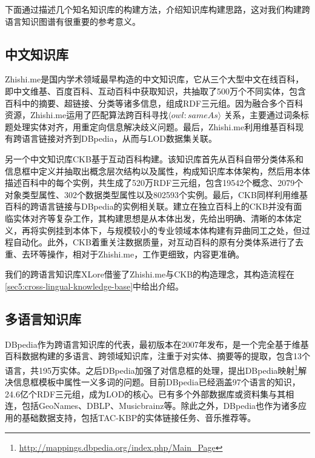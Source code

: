 下面通过描述几个知名知识库的构建方法，介绍知识库构建思路，这对我们构建跨语言知识图谱有很重要的参考意义。

\subsection{中文知识库}

Zhishi.me\cite{niu2011zhishi,wang2014publishing}是国内学术领域最早构造的中文知识库，它从三个大型中文在线百科，即中文维基、百度百科、互动百科中获取知识，共抽取了500万个不同实体，包含百科中的摘要、超链接、分类等诸多信息，组成RDF三元组。因为融合多个百科资源，Zhishi.me运用了匹配算法跨百科寻找$\langle owl:sameAs\rangle$ 关系，主要通过词条标题处理实体对齐，用重定向信息解决歧义问题。最后，Zhishi.me利用维基百科现有跨语言链接对齐到DBpedia，从而与LOD数据集关联。

另一个中文知识库CKB\cite{wang2011building}基于互动百科构建。该知识库首先从百科自带分类体系和信息框中定义并抽取出概念层次结构以及属性，构成知识库本体架构，然后用本体描述百科中的每个实例，共生成了520万RDF三元组，包含19542个概念、2079个对象类型属性、302个数据类型属性以及802593个实例。最后，CKB同样利用维基百科的跨语言链接与DBpedia的实例相关联。建立在独立百科上的CKB并没有面临实体对齐等复杂工作，其构建思想是从本体出发，先给出明确、清晰的本体定义，再将实例挂到本体下，与规模较小的专业领域本体构建有异曲同工之处，但过程自动化。此外，CKB着重关注数据质量，对互动百科的原有分类体系进行了去重、去环等操作，相对于Zhishi.me，工作更细致，内容更准确。

我们的跨语言知识库XLore借鉴了Zhishi.me与CKB的构造理念，其构造流程在\ref{sec5:cross-lingual-knowledge-base}中给出介绍。

\subsection{多语言知识库}
DBpedia作为跨语言知识库的代表，最初版本在2007年发布\cite{auer2007dbpedia}，是一个完全基于维基百科数据构建的多语言、跨领域知识库，注重于对实体、摘要等的提取，包含13个语言，共195万实体。之后DBpedia加强了对信息框的处理，提出DBpedia映射\footnote{\url{http://mappings.dbpedia.org/index.php/Main_Page}}解决信息框模板中属性一义多词的问题。目前DBpedia已经涵盖97个语言的知识，24.6亿个RDF三元组，成为LOD的核心。已有多个外部数据库或资料集与其相连，包括GeoNames、DBLP、Musicbrainz等。除此之外，DBpedia也作为诸多应用的基础数据支持，包括TAC-KBP\cite{mendes2011evaluating}的实体链接任务、音乐推荐\cite{passant2010dbrec}等。


